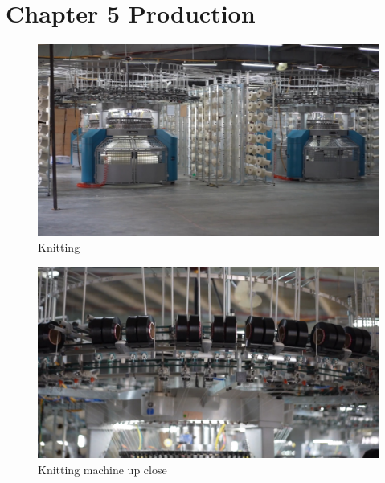 

\section{Chapter 5 Production}
\begin{figure}[ht]
    \centering
    \includegraphics[width=1\linewidth]{figs/knitting.jpg}
    \caption{Knitting}
    \label{fig:knitting}
\end{figure}

\begin{figure}[ht]
    \centering
    \includegraphics[width=1\linewidth]{figs/knitting_closeup.jpg}
    \caption{Knitting machine up close}
    \label{fig:knitting_closeup}
\end{figure}

